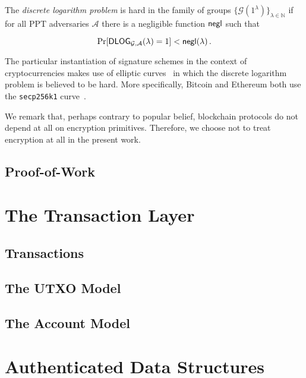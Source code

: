 

\begin{definition}
  The \emph{discrete logarithm problem} is hard in the family of groups $\{\mathcal{G}(1^\lambda)\}_{\lambda \in \mathbb{N}}$ if for all PPT adversaries $\mathcal{A}$ there is a negligible function $\mathsf{negl}$ such that

  \[
    \Pr[\textsf{DLOG}_{\mathcal{G},\mathcal{A}}(\lambda) = 1] < \mathsf{negl}(\lambda)\,.
  \]
\end{definition}

The particular instantiation of signature schemes in the context of
cryptocurrencies makes use of elliptic curves~\cite{ec} in which the discrete logarithm problem is believed to be hard. More specifically, Bitcoin
and Ethereum both use the \texttt{secp256k1} curve~\cite{secp256k1}.

\begin{remark}
We remark that, perhaps contrary to popular belief, blockchain protocols
do not depend at all on encryption primitives. Therefore, we choose not to
treat encryption at all in the present work.
\end{remark}

\subsection{Proof-of-Work}


\section{The Transaction Layer}
\subsection{Transactions}
\subsection{The UTXO Model}
\subsection{The Account Model}

\section{Authenticated Data Structures}
